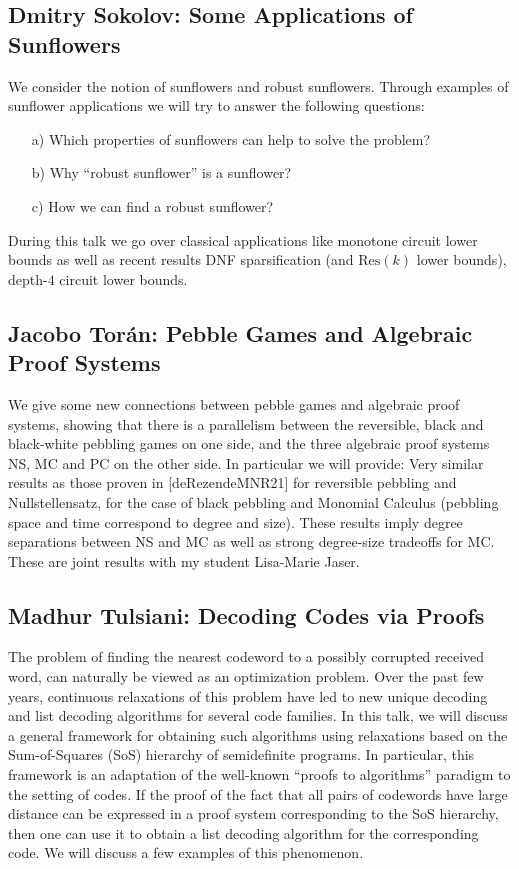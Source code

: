 \documentclass[11pt]{article}
\begin{document}
\subsection*{Dmitry Sokolov: Some Applications of Sunflowers}\label{Sokolov}

We consider the notion of sunflowers and robust sunflowers. Through examples
of sunflower applications we will try to answer the following questions:
\begin{enumerate}
  \item[a)] Which properties of sunflowers can help to solve the problem?
  \item[b)] Why ``robust sunflower'' is a sunflower?
  \item[c)] How we can find a robust sunflower?
\end{enumerate}
During this talk we go over classical applications like monotone circuit lower bounds
as well as recent results DNF sparsification (and $\mathrm{Res}(k)$ lower bounds),
depth-$4$ circuit lower bounds.


\subsection*{Jacobo Tor\'{a}n: Pebble Games and Algebraic Proof Systems}\label{Toran}

We give some new connections between pebble games and algebraic proof systems, showing that there is a parallelism between the reversible, black and black-white pebbling games on one side, and the three algebraic proof systems NS, MC and PC on the other side. In particular we will provide: Very similar results as those proven in [deRezendeMNR21] for reversible pebbling and Nullstellensatz, for the case of black pebbling and Monomial Calculus (pebbling space and time correspond to degree and size). These results imply degree separations between NS and MC as well as strong degree-size tradeoffs for MC. These are joint results with my student Lisa-Marie Jaser.


\subsection*{Madhur Tulsiani: Decoding Codes via Proofs}\label{Tulsiani}

The problem of finding the nearest codeword to a possibly corrupted received word, can naturally be viewed as an optimization problem. Over the past few years, continuous relaxations of this problem have led to new unique decoding and list decoding algorithms for several code families. In this talk, we will discuss a general framework for obtaining such algorithms using relaxations based on the Sum-of-Squares (SoS) hierarchy of semidefinite programs. In particular, this framework is an adaptation of the well-known “proofs to algorithms” paradigm to the setting of codes. If the proof of the fact that all pairs of codewords have large distance can be expressed in a proof system corresponding to the SoS hierarchy, then one can use it to obtain a list decoding algorithm for the corresponding code. We will discuss a few examples of this phenomenon.
\end{document}
